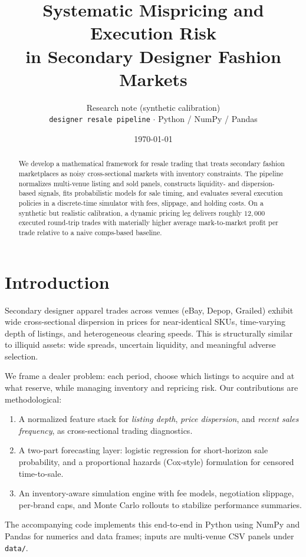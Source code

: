 \documentclass[11pt,a4paper]{article}
\title{\vspace{-1.2em}Systematic Mispricing and Execution Risk\\in Secondary Designer Fashion Markets}
\author{Research note (synthetic calibration)\\[0.25em]
\small\texttt{designer resale pipeline} $\cdot$ Python / NumPy / Pandas}
\date{\today}
\begin{document}
\maketitle
\begin{abstract}
We develop a mathematical framework for resale trading that treats secondary fashion marketplaces
as noisy cross-sectional markets with inventory constraints. The pipeline normalizes multi-venue listing
and sold panels, constructs liquidity- and dispersion-based signals, fits probabilistic models for
sale timing, and evaluates several execution policies in a discrete-time simulator with fees,
slippage, and holding costs. On a synthetic but realistic calibration, a dynamic pricing leg
delivers roughly $12{,}000$ executed round-trip trades with materially higher average mark-to-market
profit per trade relative to a naive comps-based baseline.
\end{abstract}

\section{Introduction}
Secondary designer apparel trades across venues (eBay, Depop, Grailed) exhibit wide cross-sectional
dispersion in prices for near-identical SKUs, time-varying depth of listings, and heterogeneous
clearing speeds. This is structurally similar to illiquid assets: wide spreads, uncertain
liquidity, and meaningful adverse selection.

We frame a dealer problem: each period, choose which listings to acquire and at what reserve,
while managing inventory and repricing risk. Our contributions are methodological:
\begin{enumerate}
  \item A normalized feature stack for \emph{listing depth}, \emph{price dispersion}, and
        \emph{recent sales frequency}, as cross-sectional trading diagnostics.
  \item A two-part forecasting layer: logistic regression for short-horizon sale probability,
        and a proportional hazards (Cox-style) formulation for censored time-to-sale.
  \item An inventory-aware simulation engine with fee models, negotiation slippage, per-brand caps,
        and Monte Carlo rollouts to stabilize performance summaries.
\end{enumerate}
The accompanying code implements this end-to-end in Python using NumPy and Pandas for numerics
and data frames; inputs are multi-venue CSV panels under \texttt{data/}.
\end{document}

